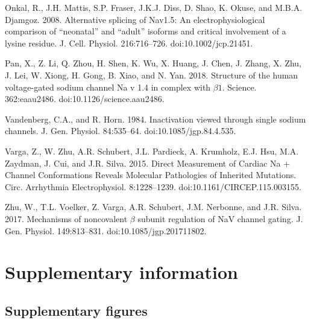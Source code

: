 \begin{hangparas}{.25in}{1}
Onkal, R., J.H. Mattis, S.P. Fraser, J.K.J. Diss, D. Shao, K. Okuse, and M.B.A. Djamgoz. 2008. Alternative splicing of Nav1.5: An electrophysiological comparison of “neonatal” and “adult” isoforms and critical involvement of a lysine residue. J. Cell. Physiol. 216:716–726. doi:10.1002/jcp.21451.

Pan, X., Z. Li, Q. Zhou, H. Shen, K. Wu, X. Huang, J. Chen, J. Zhang, X. Zhu, J. Lei, W. Xiong, H. Gong, B. Xiao, and N. Yan. 2018. Structure of the human voltage-gated sodium channel Na v 1.4 in complex with $\beta1$. Science. 362:eaau2486. doi:10.1126/science.aau2486.

Vandenberg, C.A., and R. Horn. 1984. Inactivation viewed through single sodium channels. J. Gen. Physiol. 84:535–64. doi:10.1085/jgp.84.4.535.

Varga, Z., W. Zhu, A.R. Schubert, J.L. Pardieck, A. Krumholz, E.J. Hsu, M.A. Zaydman, J. Cui, and J.R. Silva. 2015. Direct Measurement of Cardiac Na + Channel Conformations Reveals Molecular Pathologies of Inherited Mutations. Circ. Arrhythmia Electrophysiol. 8:1228–1239. doi:10.1161/CIRCEP.115.003155.

Zhu, W., T.L. Voelker, Z. Varga, A.R. Schubert, J.M. Nerbonne, and J.R. Silva. 2017. Mechanisms of noncovalent $\beta$ subunit regulation of NaV channel gating. J. Gen. Physiol. 149:813–831. doi:10.1085/jgp.201711802.
\end{hangparas}

\clearpage

\renewcommand{\thefigure}{A.S\arabic{figure}}
\renewcommand{\figurename}{Supplementary Fig.}
\setcounter{figure}{0}

\renewcommand{\thetable}{A.S\arabic{table}}
\renewcommand{\tablename}{Supplementary Table}
\setcounter{table}{0}

\section{Supplementary information}

\subsection{Supplementary figures}

